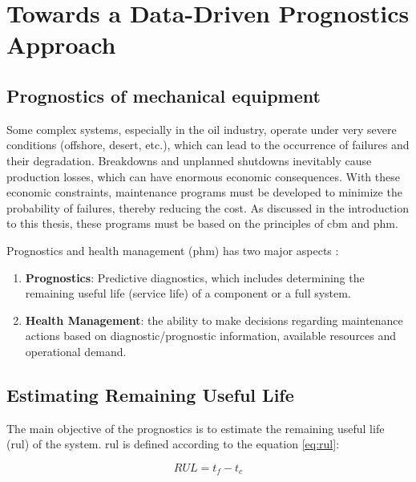 \chapter{Towards a Data-Driven Prognostics Approach}


\section{Prognostics of mechanical equipment}
Some complex systems, especially in the oil industry, operate under very severe conditions (offshore, desert, etc.), which can lead to the occurrence of failures and their degradation. Breakdowns and unplanned shutdowns inevitably cause production losses, which can have enormous economic consequences. With these economic constraints, maintenance programs must be developed to minimize the probability of failures, thereby reducing the cost. As discussed in the introduction to this thesis, these programs must be based on the principles of \acrlong{cbm} and \acrlong{phm}.


Prognostics and health management (\acrlong{phm}) has two major aspects \cite{Hess2008}:

\begin{enumerate}
    \item \textbf{Prognostics}: Predictive diagnostics, which includes determining the remaining useful life (service life) of a component or a full system.
    \item \textbf{Health Management}: the ability to make decisions regarding maintenance actions based on diagnostic/prognostic information, available resources and operational demand.
\end{enumerate}

\section{Estimating Remaining Useful Life}
\label{section:rul}
\label{section:rul-estimation}
The main objective of the prognostics is to estimate the remaining useful life (\acrlong{rul}) of the system.
\acrshort{rul} is defined according to the equation \ref{eq:rul}:

\begin{equation}
    RUL = t_f-t_c
    \label{eq:rul}
\end{equation}



